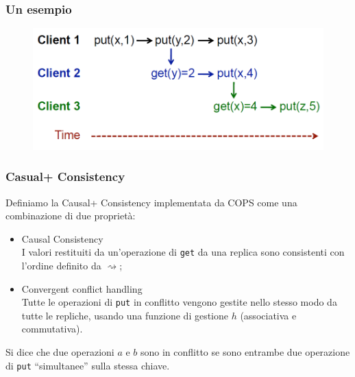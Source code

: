 \begin{frame}
\frametitle{Un esempio}
	\begin{figure}
		\centering
		\includegraphics[scale=0.40]{COPS/COPS2.png}
	\end{figure}
\end{frame}

\begin{frame}
\frametitle{Casual+ Consistency}
\begin{definizione}
Definiamo la \alert{Causal+ Consistency} implementata da COPS come una combinazione di due proprietà:
	\begin{itemize}
		\item<1-> Causal Consistency \\
				  I valori restituiti da un'operazione di \texttt{get} da una replica sono 
				  consistenti con l'ordine definito da $\rightsquigarrow$;
		\item<1-> Convergent conflict handling \\
				  Tutte le operazioni di \texttt{put} in conflitto vengono gestite nello
				  stesso modo da tutte le repliche, usando una funzione di gestione $h$ (associativa
				  e commutativa).
	\end{itemize}
\end{definizione}

\begin{definizione}
Si dice che due operazioni $a$ e $b$ sono \alert{in conflitto} se sono entrambe
due operazione di \texttt{put} ``simultanee'' sulla stessa chiave.
\end{definizione}
\end{frame}

